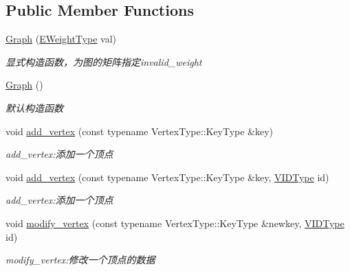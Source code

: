 \subsection*{Public Member Functions}
\begin{DoxyCompactItemize}
\item 
\hyperlink{struct_introduction_to_algorithm_1_1_graph_algorithm_1_1_graph_abf135ee348e9e459f11cb5bfd24c01c9}{Graph} (\hyperlink{struct_introduction_to_algorithm_1_1_graph_algorithm_1_1_graph_ab398c44ce5ea13c66b38edfcbdd2cdc3}{E\+Weight\+Type} val)
\begin{DoxyCompactList}\small\item\em 显式构造函数，为图的矩阵指定{\ttfamily invalid\+\_\+weight} \end{DoxyCompactList}\item 
\hyperlink{struct_introduction_to_algorithm_1_1_graph_algorithm_1_1_graph_abe5801f8c6fb552f2cd9e4b36a9431a1}{Graph} ()
\begin{DoxyCompactList}\small\item\em 默认构造函数 \end{DoxyCompactList}\item 
void \hyperlink{struct_introduction_to_algorithm_1_1_graph_algorithm_1_1_graph_a9983d29545c0d12fc78ee2fea3d05089}{add\+\_\+vertex} (const typename Vertex\+Type\+::\+Key\+Type \&key)
\begin{DoxyCompactList}\small\item\em add\+\_\+vertex\+:添加一个顶点 \end{DoxyCompactList}\item 
void \hyperlink{struct_introduction_to_algorithm_1_1_graph_algorithm_1_1_graph_adaf375cfcd98d76c3973accaf65e2686}{add\+\_\+vertex} (const typename Vertex\+Type\+::\+Key\+Type \&key, \hyperlink{struct_introduction_to_algorithm_1_1_graph_algorithm_1_1_graph_a60819f2040f2ac261a680db30b0f4409}{V\+I\+D\+Type} id)
\begin{DoxyCompactList}\small\item\em add\+\_\+vertex\+:添加一个顶点 \end{DoxyCompactList}\item 
void \hyperlink{struct_introduction_to_algorithm_1_1_graph_algorithm_1_1_graph_a075854efc94666c9d230889383b2e0aa}{modify\+\_\+vertex} (const typename Vertex\+Type\+::\+Key\+Type \&newkey, \hyperlink{struct_introduction_to_algorithm_1_1_graph_algorithm_1_1_graph_a60819f2040f2ac261a680db30b0f4409}{V\+I\+D\+Type} id)
\begin{DoxyCompactList}\small\item\em modify\+\_\+vertex\+:修改一个顶点的数据 \end{DoxyCompactList}\item 

\end{DoxyCompactItemize}
